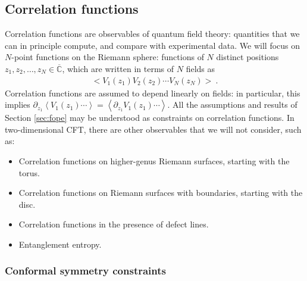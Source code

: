 \documentclass[12pt, a4paper]{article}
\theoremstyle{break}
\begin{document}
\subsection{Correlation functions}\label{sec:cor}

Correlation functions are observables of quantum field theory: quantities that we can in principle compute, and compare with experimental data. We will focus on $N$-point functions on the Riemann sphere: functions of $N$ distinct positions $z_1,z_2,\dots, z_N\in \overline{\mathbb{C}}$, which are written in terms of $N$ fields as 
\begin{align}
 \Big< V_1(z_1) V_2(z_2) \cdots V_N(z_N)\Big>\ . 
\end{align}
Correlation functions are assumed to depend linearly on fields: in particular, this implies $\partial_{z_1}\left<  V_1(z_1) \cdots \right> = \left< \partial_{z_1} V_1(z_1) \cdots \right>$.
All the assumptions and results of Section \ref{sec:fope} may be understood as constraints on correlation functions. 
In two-dimensional CFT, there are other observables that we will not consider, such as: 
\begin{itemize}
 \item Correlation functions on higher-genus Riemann surfaces, starting with the torus. 
 \item Correlation functions on Riemann surfaces with boundaries, starting with the disc. 
 \item Correlation functions in the presence of defect lines. 
 \item Entanglement entropy. 
\end{itemize}

\subsubsection{Conformal symmetry constraints}\label{sec:csc}
\end{document}
